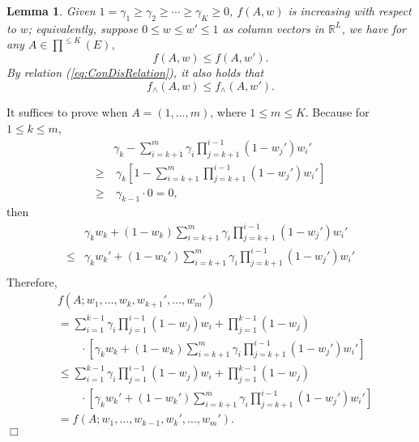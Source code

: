 \documentclass{article}
\newcommand{\RR}{\mathbb{R}}
\newtheorem{lemma}[theorem]{Lemma}%
\newenvironment{proof}{\noindent {\textbf{Proof. }}}{$\Box$ \medskip}
\begin{document}
\begin{lemma}
\label{lem:increasing} 
Given $1 = \gamma_1 \geq \gamma_2 \geq \cdots \geq \gamma_K \geq 0$, $f(A, w)$ is increasing with respect to $w$; equivalently, suppose $0 \leq w \leq w' \leq 1$ as column vectors in $\RR^L$, we have for any $A \in \prod^{\leq K}(E)$,
$$
f(A, w) \leq f(A, w').
$$
By relation (\ref{eq:ConDisRelation}), it also holds that
$$
f_{\wedge}(A, w) \leq f_{\wedge}(A, w').
$$
\end{lemma}
\begin{proof}
It suffices to prove when $A = (1, \ldots, m)$, where $1 \leq m \leq K$. Because for $1 \leq k \leq m$,
\begin{align*}
&\gamma_{k} - \sum_{i=k+1}^m \gamma_i \prod_{j = k + 1}^{i - 1} (1 - w_j') w_i'\\
\geq &~\gamma_k [1 - \sum_{i=k+1}^m \prod_{j=k+1}^{i-1}(1 - w_j') w_i']\\
\geq &~\gamma_{k-1} \cdot 0 = 0,
\end{align*}
then
\begin{align*}
&\gamma_k w_k + (1 - w_k)\sum_{i=k+1}^m \gamma_i \prod_{j=k+1}^{i-1}(1 - w_j') w_i'\\
\leq &\gamma_k w_k' + (1 - w_k')\sum_{i=k+1}^m \gamma_i \prod_{j=k+1}^{i-1}(1 - w_j') w_i'\\
\end{align*}
Therefore, 
\begin{align*}
& f(A; w_1, \dots, w_k, w_{k+1}', \dots, w_m')\\
&=\sum_{i=1}^{k-1} \gamma_i \prod_{j=1}^{i-1}(1 - w_j) w_i + \prod_{j=1}^{k-1}(1 - w_j) \\
&\qquad \cdot [\gamma_k w_k + (1 - w_k)\sum_{i=k+1}^m \gamma_i \prod_{j=k+1}^{i-1}(1 - w_j') w_i']\\
&\leq \sum_{i=1}^{k-1} \gamma_i \prod_{j=1}^{i-1}(1 - w_j) w_i + \prod_{j=1}^{k-1}(1 - w_j) \\
&\qquad \cdot [\gamma_k w_k' + (1 - w_k')\sum_{i=k+1}^m \gamma_i \prod_{j=k+1}^{i-1}(1 - w_j') w_i']\\
&=f(A; w_1, \ldots, w_{k-1}, w_{k}', \ldots, w_m').
\end{align*}
\end{proof}
\end{document}

